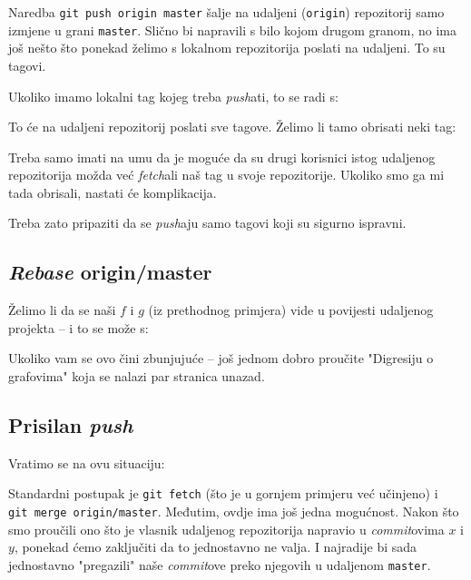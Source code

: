 Naredba \verb+git push origin master+ šalje na udaljeni (\verb+origin+) repozitorij samo izmjene u grani \verb+master+.
Slično bi napravili s bilo kojom drugom granom, no ima još nešto što ponekad želimo s lokalnom repozitorija poslati na udaljeni.
To su tagovi.

Ukoliko imamo lokalni tag kojeg treba \emph{push}ati, to se radi s:


To će na udaljeni repozitorij poslati sve tagove.
Želimo li tamo obrisati neki tag:


Treba samo imati na umu da je moguće da su drugi korisnici istog udaljenog repozitorija možda već \emph{fetch}ali naš tag u svoje repozitorije.
Ukoliko smo ga mi tada obrisali, nastati će komplikacija.

Treba zato pripaziti da se \emph{push}aju samo tagovi koji su sigurno ispravni.

\subsection*{\emph{Rebase} origin/master}

Želimo li da se naši $f$ i $g$ (iz prethodnog primjera) vide u povijesti udaljenog projekta -- i to se može s:


Ukoliko vam se ovo čini zbunjujuće -- još jednom dobro proučite "Digresiju o grafovima" koja se nalazi par stranica unazad.

\subsection*{Prisilan \emph{push}}

Vratimo se na ovu situaciju:



Standardni postupak je \verb+git fetch+ (što je u gornjem primjeru već učinjeno) i \\ \verb+git merge origin/master+.
Međutim, ovdje ima još jedna mogućnost.
Nakon što smo proučili ono što je vlasnik udaljenog repozitorija napravio u \emph{commit}ovima $x$ i $y$, ponekad ćemo zaključiti da to jednostavno ne valja. 
I najradije bi sada jednostavno "pregazili" naše \emph{commit}ove preko njegovih u udaljenom \verb+master+.

